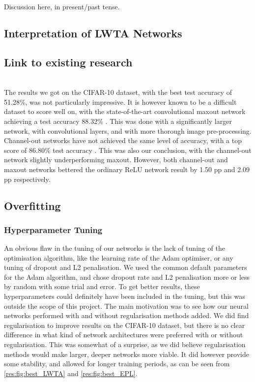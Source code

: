 Discussion here, in present/past tense.

\subsection{Interpretation of LWTA Networks}


\subsection{Link to existing research}
     \\
    The results we got on the CIFAR-10 dataset, with the best test accuracy of 51.28\%, was not particularly impressive. It is however known to be a difficult dataset to score well on, with the state-of-the-art convolutional maxout network achieving a test accuracy 88.32\% \citep{Maxout_Networks}. This was done with a significantly larger network, with convolutional layers, and with more thorough image pre-processing. Channel-out networks have not achieved the same level of accuracy, with a top score of 86.80\% test accuracy \citep{Wang}. This was also our conclusion, with the channel-out network slightly underperforming maxout. However, both channel-out and maxout networks bettered the ordinary ReLU network result by 1.50 pp and 2.09 pp respectively.



\subsection{Overfitting}


\subsubsection{Hyperparameter Tuning}
    An obvious flaw in the tuning of our networks is the lack of tuning of the optimisation algorithm, like the learning rate of the Adam optimiser, or any tuning of dropout and L2 penalisation. We used the common default parameters for the Adam algorithm, and chose dropout rate and L2 penalisation more or less by random with some trial and error. To get better results, these hyperparameters could definitely have been included in the tuning, but this was outside the scope of this project. The main motivation was to see how our neural networks performed with and without regularisation methods added.
    We did find regularisation to improve results on the CIFAR-10 dataset, but there is no clear difference in what kind of network architectures were preferred with or without regularisation. This was somewhat of a surprise, as we did believe regularisation methods would make larger, deeper networks more viable. It did however provide some stability, and allowed for longer training periods, as can be seen from \cref{res:fig:best_LWTA} and \cref{res:fig:best_EPL}.

